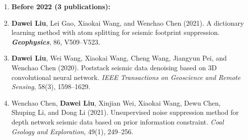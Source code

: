 \documentclass[11pt,a4paper]{article}
\begin{document}
\begin{enumerate}[leftmargin=1.5em, itemsep=0pt, topsep=2pt]
    \item[] \hspace{-25pt} \textbf{Before 2022 (3 publications):}
    \item \textbf{Dawei Liu}, Lei Gao, Xiaokai Wang, and Wenchao Chen (2021). A dictionary learning method with atom splitting for seismic footprint suppression. {\bf \em Geophysics}, 86, V509--V523.
    \item \textbf{Dawei Liu}, Wei Wang, Xiaokai Wang, Cheng Wang, Jiangyun Pei, and Wenchao Chen (2020). Poststack seismic data denoising based on 3D convolutional neural network. {\em IEEE Transactions on Geoscience and Remote Sensing}, 58(3), 1598--1629.
    \item Wenchao Chen, \textbf{Dawei Liu}, Xinjian Wei, Xiaokai Wang, Dewu Chen, Shuping Li, and Dong Li (2021). Unsupervised noise suppression method for depth network seismic data based on prior information constraint. {\em Coal Geology and Exploration}, 49(1), 249--256.
\end{enumerate}
\end{document}
